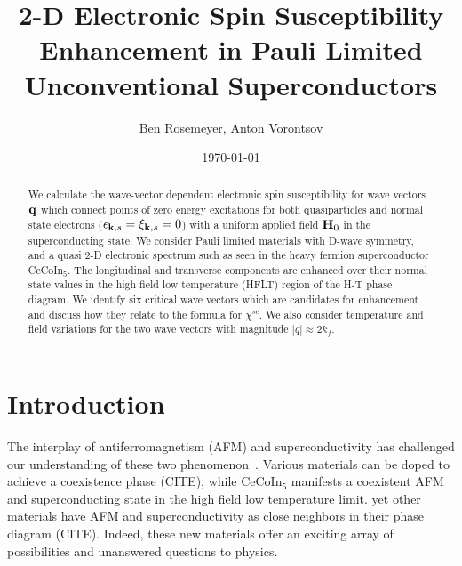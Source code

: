 \documentclass[usletter,aps,prb,10pt,amssymb,amsmath,twocolumn]{revtex4-1}
\begin{document}
\title{2-D Electronic Spin Susceptibility Enhancement in Pauli Limited Unconventional Superconductors}
\author{Ben Rosemeyer, Anton Vorontsov}
\date{\today}
\begin{abstract}
We calculate the wave-vector dependent electronic spin susceptibility for wave vectors $\bf q$ which connect points of zero energy excitations for both quasiparticles and normal state electrons ($\epsilon_{{\bf k},s} = \xi_{{\bf k},s} = 0$) with a uniform applied field ${\bf H}_0$ in the superconducting state. We consider Pauli limited materials with D-wave symmetry, and a quasi 2-D electronic spectrum such as seen in the heavy fermion superconductor CeCoIn$_5$. The longitudinal and transverse components are enhanced over their normal state values in the high field low temperature (HFLT) region of the H-T phase diagram. We identify six critical wave vectors which are candidates for enhancement and discuss how they relate to the formula for $\chi^{sc}$. We also consider temperature and field variations for the two wave vectors with magnitude $|q|\approx 2k_f$.

\end{abstract}
\maketitle


\section{Introduction}
The interplay of antiferromagnetism (AFM) and superconductivity has challenged our understanding of these two phenomenon~\cite{spin_sus_dyn,sdw_vortex,sc_afm_ikeda,sc_afm_kato,mag_afm_fflo_sigrist,sc_sdw_anton}. Various materials can be doped to achieve a coexistence phase (CITE), while CeCoIn$_5$ manifests a coexistent AFM and superconducting state in the high field low temperature limit. yet other materials have AFM and superconductivity as close neighbors in their phase diagram (CITE). Indeed, these new materials offer an exciting array of possibilities and unanswered questions to physics.
\end{document}

